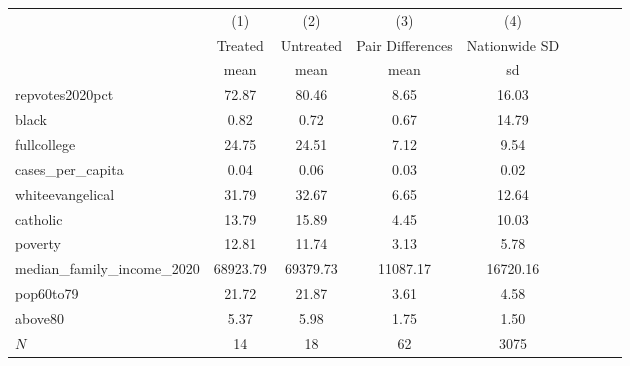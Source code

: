 {
\def\sym#1{\ifmmode^{#1}\else\(^{#1}\)\fi}
\begin{tabular}{l*{4}{cc}}
\hline\hline
            &\multicolumn{1}{c}{(1)}&\multicolumn{1}{c}{(2)}&\multicolumn{1}{c}{(3)}&\multicolumn{1}{c}{(4)}\\
            &     Treated&   Untreated&Pair Differences&Nationwide SD\\
            &        mean&        mean&        mean&          sd\\
\hline
repvotes2020pct&       72.87&       80.46&        8.65&       16.03\\
black       &        0.82&        0.72&        0.67&       14.79\\
fullcollege &       24.75&       24.51&        7.12&        9.54\\
cases\_per\_capita&        0.04&        0.06&        0.03&        0.02\\
whiteevangelical&       31.79&       32.67&        6.65&       12.64\\
catholic    &       13.79&       15.89&        4.45&       10.03\\
poverty     &       12.81&       11.74&        3.13&        5.78\\
median\_family\_income\_2020&    68923.79&    69379.73&    11087.17&    16720.16\\
pop60to79   &       21.72&       21.87&        3.61&        4.58\\
above80     &        5.37&        5.98&        1.75&        1.50\\
\hline
\(N\)       &          14&          18&          62&        3075\\
\hline\hline
\end{tabular}
}
